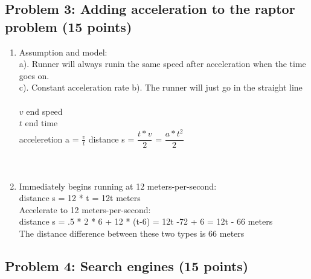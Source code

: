 \documentclass[]{article}
\begin{document}
\subsection{Problem 3: Adding acceleration to the raptor problem (15
points)}\label{problem-3-adding-acceleration-to-the-raptor-problem-15-points}


\begin{enumerate}
\def\labelenumi{\arabic{enumi}.}
\item
Assumption and model:\\
a). Runner will always runin the same speed after acceleration when the time goes on.\\
c). Constant acceleration rate
b). The runner will just go in the straight line\\\\
$ v $ end speed\\
$ t $ end time\\
acceleretion a = $ \frac{v}{t} $
distance s = $ \dfrac{t * v}{2} $ = $ \dfrac{a * t^{2}}{2} $
\\\\\\

\item
 Immediately begins running at 12 meters-per-second: \\
 \indent distance s = 12 * t = 12t meters\\
 Accelerate to 12 meters-per-second:\\
 \indent distance s = .5 * 2  * 6 + 12 * (t-6) = 12t -72 + 6 = 12t - 66 meters \\
 
 The distance difference between these two types is 66 meters
\end{enumerate}

\subsection{Problem 4: Search engines (15
points)}\label{problem-4-search-engines-15-points}
\end{document}
